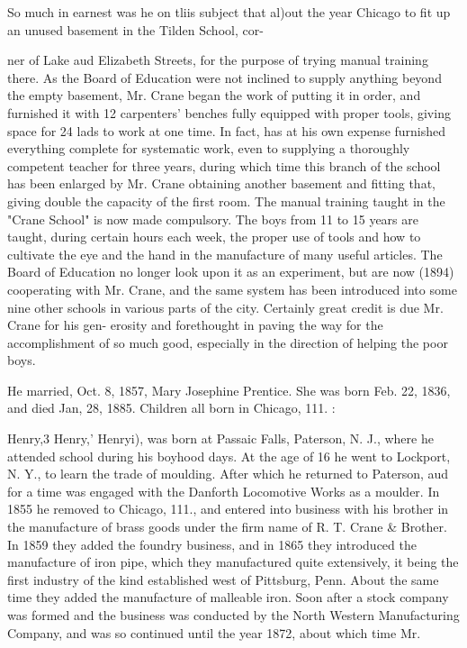 \documentclass{book}
\begin{document}
So much in earnest was he on tliis subject that al)out the year 
Chicago to fit up an unused basement in the Tilden School, cor- 




ner of Lake aud Elizabeth Streets, for the purpose of trying 
manual training there. As the Board of Education were not 
inclined to supply anything beyond the empty basement, Mr. 
Crane began the work of putting it in order, and furnished it 
with 12 carpenters' benches fully equipped with proper tools, 
giving space for 24 lads to work at one time. In fact, has at his 
own expense furnished everything complete for systematic work, 
even to supplying a thoroughly competent teacher for three years, 
during which time this branch of the school has been enlarged by 
Mr. Crane obtaining another basement and fitting that, giving 
double the capacity of the first room. The manual training 
taught in the "Crane School" is now made compulsory. The 
boys from 11 to 15 years are taught, during certain hours each 
week, the proper use of tools and how to cultivate the eye and 
the hand in the manufacture of many useful articles. The Board 
of Education no longer look upon it as an experiment, but are 
now (1894) cooperating with Mr. Crane, and the same system 
has been introduced into some nine other schools in various parts 
of the city. Certainly great credit is due Mr. Crane for his gen- 
erosity and forethought in paving the way for the accomplishment 
of so much good, especially in the direction of helping the poor 
boys. 

He married, Oct. 8, 1857, Mary Josephine Prentice. She was 
born Feb. 22, 1836, and died Jan, 28, 1885. Children all born 
in Chicago, 111. : 










Henry,3 Henry,' Henryi), was born at Passaic Falls, Paterson, 
N. J., where he attended school during his boyhood days. At 
the age of 16 he went to Lockport, N. Y., to learn the trade of 
moulding. After which he returned to Paterson, aud for a time 
was engaged with the Danforth Locomotive Works as a moulder. 
In 1855 he removed to Chicago, 111., and entered into business 
with his brother in the manufacture of brass goods under the firm 
name of R. T. Crane \& Brother. In 1859 they added the foundry 
business, and in 1865 they introduced the manufacture of iron 
pipe, which they manufactured quite extensively, it being the 
first industry of the kind established west of Pittsburg, Penn. 
About the same time they added the manufacture of malleable 
iron. Soon after a stock company was formed and the business 
was conducted by the North Western Manufacturing Company, 
and was so continued until the year 1872, about which time Mr. 
\end{document}
